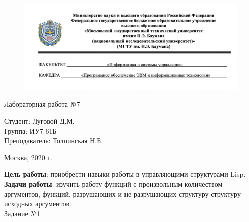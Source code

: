 


	
\begin{figure}[h!]
	\begin{center}
		{\includegraphics[width = \textwidth]{titul.png}}
	\end{center}
\end{figure}

\vspace*{20mm}

\huge
\begin{center}
	Лабораторная работа №7
\end{center}


\vspace*{50mm}

\large
\begin{flushleft}
	Студент: Луговой Д.М. \\
	Группа: ИУ7-61Б \\
	Преподаватель: Толпинская Н.Б.
\end{flushleft}

\vspace*{60mm}

\large
\begin{center}
	Москва, 2020 г.
\end{center}

\thispagestyle{empty}

\newpage
\vspace*{10mm}
\textbf{Цель работы}: приобрести навыки работы в управляющими структурами Lisp.\\

\textbf{Задачи работы}: изучить работу функций с произвольным количеством аргументов, функций, разрушающих и не разрушающих структуру структуру исходных аргументов.\\

\vspace*{10mm}
{\LARGE Задание №1}\\


